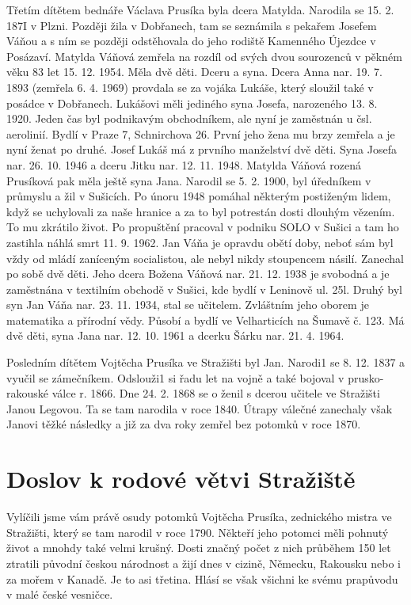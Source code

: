 \documentclass[../dejiny-rodu-prusiku.tex]{subfiles}
\begin{document}
Třetím dítětem bednáře Václava Prusíka byla dcera Matylda. Narodila se 15. 2. 187I v Plzni. Později žila v Dobřanech, tam se seznámila s pekařem Josefem Váňou a s ním se později odstěhovala do jeho rodiště Kamenného Újezdce v Posázaví. Matylda Váňová zemřela na rozdíl od svých dvou sourozenců v pěkném věku 83 let 15. 12. 1954. Měla dvě děti. Dceru a syna. Dcera Anna nar. 19. 7. 1893 (zemřela 6. 4. 1969) provdala se za vojáka Lukáše, který sloužil také v posádce v Dobřanech. Lukášovi měli jediného syna Josefa, narozeného 13. 8. 1920. Jeden čas byl podnikavým obchodníkem, ale nyní je zaměstnán u čsl. aerolinií. Bydlí v Praze 7, Schnirchova 26. První jeho žena mu brzy zemřela a je nyní ženat po druhé. Josef Lukáš má z prvního manželství dvě děti. Syna Josefa nar. 26. 10. 1946 a dceru Jitku nar. 12. 11. 1948. Matylda Váňová rozená Prusíková pak měla ještě syna Jana. Narodil se 5. 2. 1900, byl úředníkem v průmyslu a žil v Sušicích. Po únoru 1948 pomáhal některým postiženým lidem, když se uchylovali za naše hranice a za to byl potrestán dosti dlouhým vězením. To mu zkrátilo život. Po propuštění pracoval v podniku SOLO v Sušici a  tam
ho zastihla náhlá smrt 11. 9. 1962. Jan Váňa je opravdu obětí doby, neboť sám byl vždy od mládí zaníceným socialistou, ale nebyl nikdy stoupencem násilí. Zanechal po sobě dvě děti. Jeho dcera Božena Váňová nar. 21. 12. 1938 je svobodná a je zaměstnána v textilním obchodě v Sušici, kde bydlí v Leninově ul. 25l. Druhý byl syn Jan Váňa nar. 23. 11. 1934, stal se uči­telem. Zvláštním jeho oborem je matematika a přírodní vědy. Působí a bydlí ve Velharticích na Šumavě č. 123. Má dvě děti, syna Jana nar. 12. 10. 1961 a dcer­ku Šárku nar. 21. 4. 1964.

Posledním dítětem Vojtěcha Prusíka ve Stražišti byl Jan. Narodi1 se 8. 12. 1837 a vyučil se zámečníkem. Odslouži1 si řadu let na vojně a také bojoval v prusko-rakouské válce r. 1866. Dne 24. 2. 1868 se o ženil s dcerou učitele ve Stražišti Janou Legovou. Ta se tam narodila v roce 1840. Útrapy válečné zanechaly však Janovi těžké následky a již za dva roky zemřel bez po­tomků v roce 1870.

\section{Doslov k rodové větvi Stražiště}
Vylíčili jsme vám právě osudy potomků Vojtěcha Prusíka, zednického mistra ve Stražišti, který se tam narodil v roce 1790. Někteří jeho potomci měli pohnutý život a mnohdy také velmi krušný. Dosti značný počet z nich průběhem 150 let ztratili původní českou národnost a žijí dnes v cizině, Německu, Rakousku nebo i za mořem v Kanadě. Je to asi třetina. Hlásí se však všichni ke svému prapůvodu v malé české vesničce.
\end{document}
